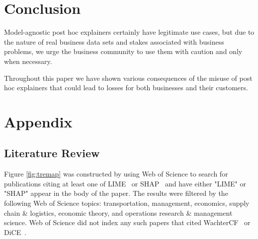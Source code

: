 \documentclass[mnsc,blindrev]{informs3}
\begin{document}
  
    



       
  
    

\section{Conclusion}
    Model-agnostic post hoc explainers certainly have legitimate use cases, but due to the nature of real business data sets and stakes associated with business problems, we urge the business community to use them with caution and only when necessary. 

    Throughout this paper we have shown various consequences of the misuse of post hoc explainers that could lead to losses for both businesses and their customers.
        











\newpage

\section{Appendix}
    \subsection{Literature Review}
        Figure \ref{fig:tremap} was constructed by using Web of Science to search for publications citing at least one of LIME~\citep{ribeiro16lime} or SHAP~\citep{lundberg17shap} and have either "LIME" or "SHAP" appear in the body of the paper.  The results were filtered by the following Web of Science topics: transportation, management, economics, supply chain \& logistics, economic theory, and operations research \& management science. Web of Science did not index any such papers that cited WachterCF~\citep{wachter17wachtercf} or DiCE~\citep{mothilal20dice}.
 
\end{document}
